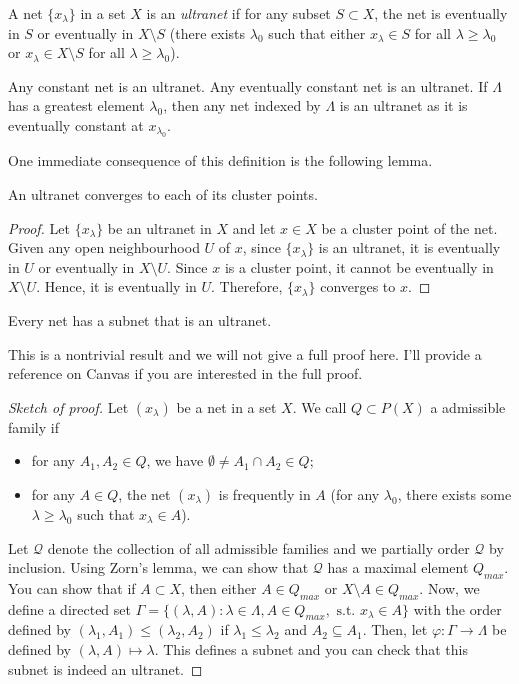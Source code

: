 \begin{definition}
    A net $\{x_\lambda\}$ in a set $X$ is an \emph{ultranet} if for any subset $S\subset X$, the net is eventually in $S$ or eventually in $X\setminus S$ (there exists $\lambda_0$ such that either $x_\lambda \in S$ for all $\lambda \geq \lambda_0$ or $x_\lambda \in X\setminus S$ for all $\lambda \geq \lambda_0$).
\end{definition}

\begin{example}
    Any constant net is an ultranet. Any eventually constant net is an ultranet. If $\Lambda$ has a greatest element $\lambda_0$, then any net indexed by $\Lambda$ is an ultranet as it is eventually constant at $x_{\lambda_0}$. 
\end{example}

One immediate consequence of this definition is the following lemma.
\begin{lemma}
    An ultranet converges to each of its cluster points.
\end{lemma}
\begin{proof}
    Let $\{x_\lambda\}$ be an ultranet in $X$ and let $x\in X$ be a cluster point of the net. Given any open neighbourhood $U$ of $x$, since $\{x_\lambda\}$ is an ultranet, it is eventually in $U$ or eventually in $X\setminus U$. Since $x$ is a cluster point, it cannot be eventually in $X\setminus U$. Hence, it is eventually in $U$. Therefore, $\{x_\lambda\}$ converges to $x$.
\end{proof}

\begin{lemma}
    Every net has a subnet that is an ultranet.
\end{lemma}
This is a nontrivial result and we will not give a full proof here. I'll provide a reference on Canvas if you are interested in the full proof.
\begin{proof}[Sketch of proof]
    Let $(x_\lambda)$ be a net in a set $X$. We call $Q\subset P(X)$ a admissible family if 
    \begin{itemize}
        \item for any $A_1,A_2\in Q$, we have $\emptyset\neq A_1\cap A_2\in Q$;
        \item for any $A\in Q$, the net $(x_\lambda)$ is frequently in $A$ (for any $\lambda_0$, there exists some $\lambda\geq \lambda_0$ such that $x_\lambda\in A$).
    \end{itemize}
    Let $\mathcal{Q}$ denote the collection of all admissible families and we partially order $\mathcal{Q}$ by inclusion. Using Zorn's lemma, we can show that $\mathcal{Q}$ has a maximal element $Q_{max}$. You can show that if $A\subset X$, then either $A\in Q_{max}$ or $X\setminus A\in Q_{max}$. Now, we define a directed set $\Gamma=\{(\lambda,A):\lambda\in \Lambda,A\in Q_{max}, \text{ s.t. }x_\lambda\in A\}$ with the order defined by $(\lambda_1,A_1)\leq (\lambda_2,A_2)$ if $\lambda_1\leq \lambda_2$ and $A_2\subseteq A_1$. Then, let $\varphi: \Gamma\to \Lambda$ be defined by $(\lambda,A)\mapsto \lambda$. This defines a subnet and you can check that this subnet is indeed an ultranet.
\end{proof}

